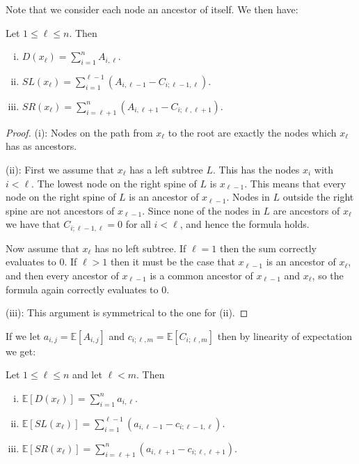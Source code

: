 Note that we consider each node an ancestor of itself. We then have:
\begin{thm}
    Let $1 \leq \ell \leq n$. Then
    \begin{enumerate}[(i)]
        \item $D(x_{\ell}) = \sum_{i=1}^{n} A_{i,\ell}$.
        \item $SL(x_{\ell}) = \sum_{i=1}^{\ell-1} (A_{i,\ell-1} - C_{i;\ell-1,\ell})$.
        \item $SR(x_{\ell}) = \sum_{i=\ell+1}^{n} (A_{i,\ell+1} - C_{i;\ell,\ell+1})$.
    \end{enumerate}
\end{thm}
\begin{proof}
(i): Nodes on the path from $x_{\ell}$ to the root are exactly the nodes which $x_{\ell}$ has as ancestors.

(ii): First we assume that $x_{\ell}$ has a left subtree $L$. This has the nodes $x_i$ with $i < \ell$. The lowest node on the right spine of $L$ is $x_{\ell-1}$. This means that every node on the right spine of $L$ is an ancestor of $x_{\ell-1}$. Nodes in $L$ outside the right spine are not ancestors of $x_{\ell-1}$. Since none of the nodes in $L$ are ancestors of $x_{\ell}$ we have that $C_{i;\ell-1,\ell} = 0$ for all $i < \ell$, and hence the formula holds.

Now assume that $x_{\ell}$ has no left subtree. If $\ell = 1$ then the sum correctly evaluates to 0. If $\ell > 1$ then it must be the case that $x_{\ell-1}$ is an ancestor of $x_{\ell}$, and then every ancestor of $x_{\ell-1}$ is a common ancestor of $x_{\ell-1}$ and $x_{\ell}$, so the formula again correctly evaluates to 0.

(iii): This argument is symmetrical to the one for (ii).
\end{proof}

If we let $a_{i,j} = \mathbb{E}[A_{i,j}]$ and $c_{i;\ell,m} = \mathbb{E}[C_{i;\ell,m}]$ then by linearity of expectation we get:
\begin{cor}
Let $1 \leq \ell \leq n$ and let $\ell < m$. Then
    \begin{enumerate}[(i)]
        \item $\mathbb{E}[D(x_{\ell})] = \sum_{i=1}^{n} a_{i,\ell}$.
        \item $\mathbb{E}[SL(x_{\ell})] = \sum_{i=1}^{\ell-1} (a_{i,\ell-1} - c_{i;\ell-1,\ell})$.
        \item $\mathbb{E}[SR(x_{\ell})] = \sum_{i=\ell+1}^{n} (a_{i,\ell+1} - c_{i;\ell,\ell+1})$.
    \end{enumerate}
\end{cor}

